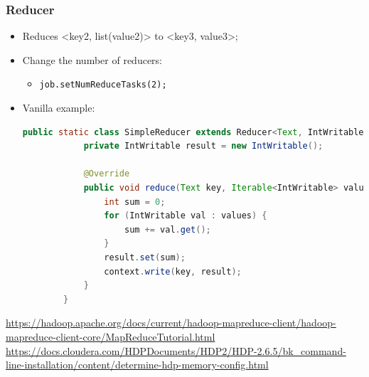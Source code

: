 \documentclass[aspectratio=169]{beamer}
\begin{document}
\begin{frame}[fragile]
	\frametitle{Reducer}

	\begin{itemize}
		\item Reduces <key2, list(value2)> to <key3, value3>;
		\item Change the number of reducers:
		      \begin{itemize}
			      \item \texttt{job.setNumReduceTasks(2);}
		      \end{itemize}
		\item Vanilla example:
		      \begin{lstlisting}[language=java,basicstyle=\tiny,columns=fullflexible]
        public static class SimpleReducer extends Reducer<Text, IntWritable, Text, IntWritable> {
            private IntWritable result = new IntWritable();

            @Override
            public void reduce(Text key, Iterable<IntWritable> values, Context context) {
                int sum = 0;
                for (IntWritable val : values) {
                    sum += val.get();
                }
                result.set(sum);
                context.write(key, result);
            }
        }
            \end{lstlisting}
	\end{itemize}

	\begin{center}
		{\tiny \href{https://hadoop.apache.org/docs/current/hadoop-mapreduce-client/hadoop-mapreduce-client-core/MapReduceTutorial.html}{https://hadoop.apache.org/docs/current/hadoop-mapreduce-client/hadoop-mapreduce-client-core/MapReduceTutorial.html}}
		{\tiny \href{https://docs.cloudera.com/HDPDocuments/HDP2/HDP-2.6.5/bk_command-line-installation/content/determine-hdp-memory-config.html}{https://docs.cloudera.com/HDPDocuments/HDP2/HDP-2.6.5/bk\_command-line-installation/content/determine-hdp-memory-config.html}}
	\end{center}
\end{frame}
\end{document}
